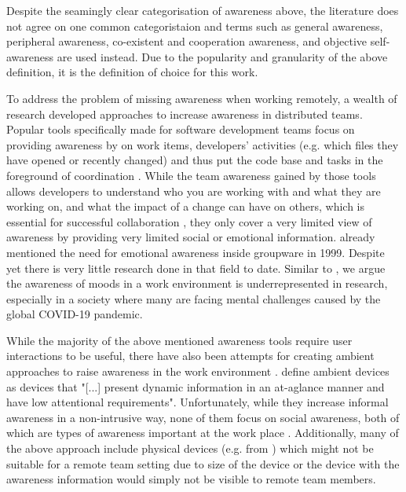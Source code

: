 Despite the seamingly clear categorisation of awareness above, the literature does not agree on one common categoristaion and terms such as general awareness, peripheral awareness, co-existent and cooperation awareness, and objective self-awareness are used instead. Due to the popularity and granularity of the above definition, it is the definition of choice for this work.

To address the problem of missing awareness when working remotely, a wealth of research developed approaches to increase awareness in distributed teams. Popular tools specifically made for software development teams focus on providing awareness by on work items, developers' activities (e.g. which files they have opened or recently changed) and thus put the code base and tasks in the foreground of coordination \autocite{biehl2007fastdash, jakobsen2009wipdash, eick1992seesoft, deline2005easing}. While the team awareness gained by those tools allows developers to understand who you are working with and what they are working on, and what the impact of a change can have on others, which is essential for successful collaboration \autocite{dourish1992awareness}, they only cover a very limited view of awareness by providing very limited social or emotional information. \textcite{garcia1999emotional} already mentioned the need for emotional awareness inside groupware in 1999. Despite yet there is very little research done in that field to date. Similar to \autocite{mora2011supporting}, we argue the awareness of moods in a work environment is underrepresented in research, especially in a society where many are facing mental challenges caused by the global COVID-19 pandemic.

While the majority of the above mentioned awareness tools require user interactions to be useful, there have also been attempts for creating ambient approaches to raise awareness in the work environment \autocite{morrison2020facilitating, otjacques2006ambient, downs2012ambient, alavi2012ambient, rocker2004using}. \textcite{downs2012ambient} define ambient devices as devices that "[...] present dynamic information in an at-aglance manner and have low attentional requirements". Unfortunately, while they increase informal awareness in a non-intrusive way, none of them focus on social awareness, both of which are types of awareness important at the work place \autocite{greenberg1996awareness}. Additionally, many of the above approach include physical devices (e.g. from \autocite{ downs2012ambient, alavi2012ambient, rocker2004using}) which might not be suitable for a remote team setting due to size of the device or the device with the awareness information would simply not be visible to remote team members.

